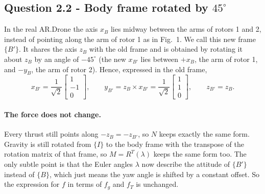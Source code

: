 \subsection*{Question 2.2 - Body frame rotated by $45^\circ$}

In the real AR.Drone the axis $x_B$ lies midway between the arms of rotors 1 and 2, instead of pointing along the arm of rotor 1 as in Fig.~1.
We call this new frame $\{B'\}$.
It shares the axis $z_B$ with the old frame and is obtained by rotating it about $z_B$ by an angle of $-45^\circ$ (the new $x_{B'}$ lies between $+x_B$, the arm of rotor 1, and $-y_B$, the arm of rotor 2).
Hence, expressed in the old frame,
\begin{equation*}
x_{B'} = \frac{1}{\sqrt{2}}\begin{bmatrix} 1 \\ -1 \\ 0 \end{bmatrix}, \qquad
y_{B'} = z_B \times x_{B'} = \frac{1}{\sqrt{2}}\begin{bmatrix} 1 \\ 1 \\ 0 \end{bmatrix}, \qquad
z_{B'} = z_B .
\end{equation*}

\paragraph{The force does not change.}
Every thrust still points along $-z_B = -z_{B'}$, so $N$ keeps exactly the same form.
Gravity is still rotated from $\{I\}$ to the body frame with the transpose of the rotation matrix of that frame, so $M = R^T(\lambda)$ keeps the same form too.
The only subtle point is that the Euler angles $\lambda$ now describe the attitude of $\{B'\}$ instead of $\{B\}$, which just means the yaw angle is shifted by a constant offset.
So the expression for $f$ in terms of $f_g$ and $f_T$ is unchanged.

